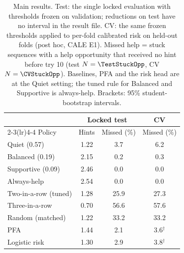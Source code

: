 \begin{table}[t]\centering\small\setlength{\tabcolsep}{1.2mm}
\begin{tabular}{lccc}
\toprule
 & \multicolumn{2}{c}{Locked test} & CV \\
\cmidrule(lr){2-3}\cmidrule(lr){4-4}
Policy & Hints & Missed (\%) & Missed (\%) \\
\midrule
Quiet (0.57)          & 1.22 & 3.7  & 6.2 \\            %
Balanced (0.19)       & 2.15 & 0.2  & 0.3 \\            %
Supportive (0.09)     & 2.46 & 0.0  & 0.0 \\            %
\midrule
Always-help           & 2.54 & 0.0  & 0.0 \\            %
Two-in-a-row (tuned)  & 1.28 & 25.9 & 27.3 \\           %
Three-in-a-row        & 0.70 & 56.6 & 57.6 \\           %
Random (matched)      & 1.22 & 33.2 & 33.2 \\           %
PFA                   & 1.44 & 2.1  & 3.6$^\dagger$ \\  %
Logistic risk         & 1.30 & 2.9  & 3.8$^\dagger$ \\  %
\bottomrule
\end{tabular}
\caption{Main results. Test: the single locked evaluation with thresholds frozen on validation; reductions on test have no interval in the result file. CV: the same frozen thresholds applied to per-fold calibrated risk on held-out folds (post hoc, CALE E1). Missed help = stuck sequences with a help opportunity that received no hint before try 10 (test $N=\TestStuckOpp$, CV $N=\CVStuckOpp$). Baselines, PFA and the risk head are at the Quiet setting; the tuned rule for Balanced and Supportive is always-help. Brackets: 95\% student-bootstrap intervals.}
\label{tab:main}
\end{table}
